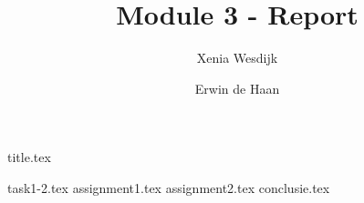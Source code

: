 \documentclass[final]{scrreprt} %
\title{Module 3 - Report}
\author{Xenia {Wesdijk} \and Erwin {de Haan}}
\begin{document}

{title.tex}

\newpage

\tableofcontents

\newpage
{}
{task1-2.tex}
{assignment1.tex}
{assignment2.tex}
{conclusie.tex}
\newpage
{}

\printbibliography
\end{document}
